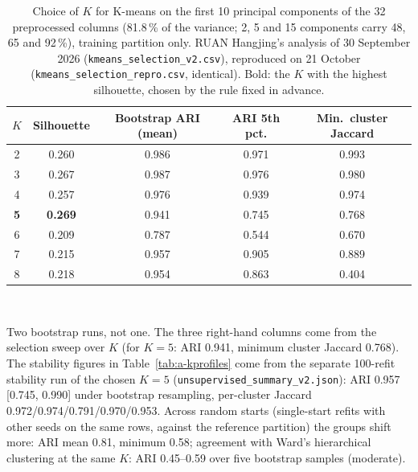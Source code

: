 \begin{table}[!htbp]
  \caption{Choice of $K$ for K-means on the first 10 principal components of the 32 preprocessed columns (81.8\,\% of the variance; 2, 5 and 15 components carry 48, 65 and 92\,\%), training partition only. RUAN Hangjing's analysis of 30 September 2026 (\texttt{kmeans\_selection\_v2.csv}), reproduced on 21 October (\texttt{kmeans\_selection\_repro.csv}, identical). Bold: the $K$ with the highest silhouette, chosen by the rule fixed in advance.}
  \label{tab:a-kselect}
  \centering
  \small
  \begin{tabular}{@{}ccccc@{}}
    \toprule
    $K$ & Silhouette & Bootstrap ARI (mean) & ARI 5th pct. & Min.\ cluster Jaccard \\
    \midrule
    2 & 0.260 & 0.986 & 0.971 & 0.993 \\
    3 & 0.267 & 0.987 & 0.976 & 0.980 \\
    4 & 0.257 & 0.976 & 0.939 & 0.974 \\
    \textbf{5} & \textbf{0.269} & 0.941 & 0.745 & 0.768 \\
    6 & 0.209 & 0.787 & 0.544 & 0.670 \\
    7 & 0.215 & 0.957 & 0.905 & 0.889 \\
    8 & 0.218 & 0.954 & 0.863 & 0.404 \\
    \bottomrule
  \end{tabular}
  \\[3pt]\begin{minipage}{\linewidth}\footnotesize Two bootstrap runs, not one. The three right-hand columns come from the selection sweep over $K$ (for $K=5$: ARI 0.941, minimum cluster Jaccard 0.768). The stability figures in Table~\ref{tab:a-kprofiles} come from the separate 100-refit stability run of the chosen $K=5$ (\texttt{unsupervised\_\allowbreak{}summary\_\allowbreak{}v2.json}): ARI 0.957 [0.745, 0.990] under bootstrap resampling, per-cluster Jaccard 0.972/0.974/0.791/0.970/0.953. Across random starts (single-start refits with other seeds on the same rows, against the reference partition) the groups shift more: ARI mean 0.81, minimum 0.58; agreement with Ward's hierarchical clustering at the same $K$: ARI 0.45--0.59 over five bootstrap samples (moderate).\end{minipage}
\end{table}

